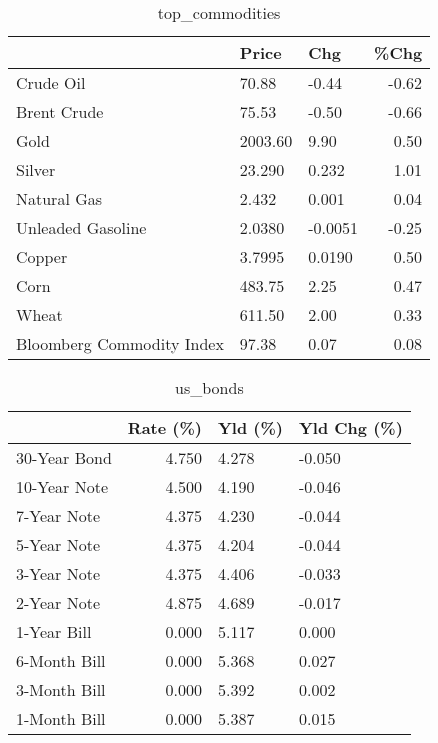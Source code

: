 \documentclass{article}%
\begin{document}
\begin{table}[htbp]%
\caption{top\_commodities}%
\centering%
\begin{adjustbox}{width=1\textwidth}%
\begin{tabular}{lllr}
\toprule
                          &   Price &     Chg &  \%Chg \\
\midrule
               Crude Oil  &   70.88 &   -0.44 & -0.62 \\
             Brent Crude  &   75.53 &   -0.50 & -0.66 \\
                    Gold  & 2003.60 &    9.90 &  0.50 \\
                  Silver  &  23.290 &   0.232 &  1.01 \\
             Natural Gas  &   2.432 &   0.001 &  0.04 \\
       Unleaded Gasoline  &  2.0380 & -0.0051 & -0.25 \\
                  Copper  &  3.7995 &  0.0190 &  0.50 \\
                    Corn  &  483.75 &    2.25 &  0.47 \\
                   Wheat  &  611.50 &    2.00 &  0.33 \\
Bloomberg Commodity Index &   97.38 &    0.07 &  0.08 \\
\bottomrule
\end{tabular}
%
\end{adjustbox}%
\end{table}

%


\begin{table}[htbp]%
\caption{us\_bonds}%
\centering%
\begin{adjustbox}{width=1\textwidth}%
\begin{tabular}{lrll}
\toprule
             &  Rate (\%) & Yld (\%) & Yld Chg (\%) \\
\midrule
30-Year Bond &     4.750 &   4.278 &      -0.050 \\
10-Year Note &     4.500 &   4.190 &      -0.046 \\
 7-Year Note &     4.375 &   4.230 &      -0.044 \\
 5-Year Note &     4.375 &   4.204 &      -0.044 \\
 3-Year Note &     4.375 &   4.406 &      -0.033 \\
 2-Year Note &     4.875 &   4.689 &      -0.017 \\
 1-Year Bill &     0.000 &   5.117 &       0.000 \\
6-Month Bill &     0.000 &   5.368 &       0.027 \\
3-Month Bill &     0.000 &   5.392 &       0.002 \\
1-Month Bill &     0.000 &   5.387 &       0.015 \\
\bottomrule
\end{tabular}
%
\end{adjustbox}%
\end{table}
\end{document}
